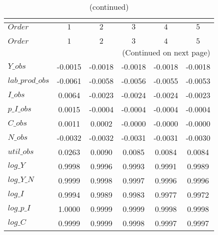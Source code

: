  
\begin{center}
\begin{longtable}{lccccc} 
\caption{COEFFICIENTS OF AUTOCORRELATION}\\
 \label{Table:th_autocorr_matrix}\\
\toprule 
$Order           $	 & 	 $          1$	 & 	 $          2$	 & 	 $          3$	 & 	 $          4$	 & 	 $          5$\\
\midrule \endfirsthead 
\caption{(continued)}\\
 \toprule \\ 
$Order           $	 & 	 $          1$	 & 	 $          2$	 & 	 $          3$	 & 	 $          4$	 & 	 $          5$\\
\midrule \endhead 
\midrule \multicolumn{6}{r}{(Continued on next page)} \\ \bottomrule \endfoot 
\bottomrule \endlastfoot 
$Y\_obs          $	 & 	    -0.0015	 & 	    -0.0018	 & 	    -0.0018	 & 	    -0.0018	 & 	    -0.0018 \\ 
$lab\_prod\_obs  $	 & 	    -0.0061	 & 	    -0.0058	 & 	    -0.0056	 & 	    -0.0055	 & 	    -0.0053 \\ 
$I\_obs          $	 & 	     0.0064	 & 	    -0.0023	 & 	    -0.0024	 & 	    -0.0024	 & 	    -0.0023 \\ 
$p\_I\_obs       $	 & 	     0.0015	 & 	    -0.0004	 & 	    -0.0004	 & 	    -0.0004	 & 	    -0.0004 \\ 
$C\_obs          $	 & 	     0.0011	 & 	     0.0002	 & 	    -0.0000	 & 	    -0.0000	 & 	    -0.0000 \\ 
$N\_obs          $	 & 	    -0.0032	 & 	    -0.0032	 & 	    -0.0031	 & 	    -0.0031	 & 	    -0.0030 \\ 
$util\_obs       $	 & 	     0.0263	 & 	     0.0090	 & 	     0.0085	 & 	     0.0084	 & 	     0.0084 \\ 
$log\_Y          $	 & 	     0.9998	 & 	     0.9996	 & 	     0.9993	 & 	     0.9991	 & 	     0.9989 \\ 
$log\_Y\_N       $	 & 	     0.9999	 & 	     0.9998	 & 	     0.9997	 & 	     0.9996	 & 	     0.9996 \\ 
$log\_I          $	 & 	     0.9994	 & 	     0.9989	 & 	     0.9983	 & 	     0.9977	 & 	     0.9972 \\ 
$log\_p\_I       $	 & 	     1.0000	 & 	     0.9999	 & 	     0.9999	 & 	     0.9998	 & 	     0.9998 \\ 
$log\_C          $	 & 	     0.9999	 & 	     0.9999	 & 	     0.9998	 & 	     0.9997	 & 	     0.9997 \\ 

\end{longtable}
\end{center}
